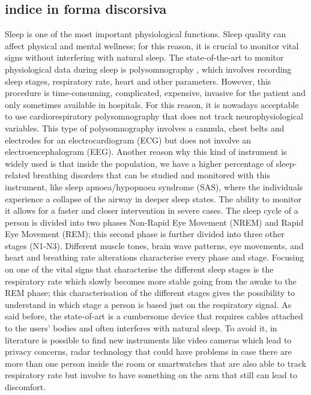 \subsection*{indice in forma discorsiva}
Sleep is one of the most important physiological functions. Sleep quality can affect physical 
and mental wellness; for this reason,
it is crucial to monitor vital signs without interfering with natural sleep. 
The state-of-the-art to monitor physiological data during sleep is polysomnography%
, which involves recording sleep stages, respiratory rate, heart and other parameters. However, this procedure is time-consuming, 
complicated, expensive, invasive for the patient and only sometimes available in hospitals. For this reason, it is nowadays 
acceptable to use cardiorespiratory polysomnography that does not track neurophysiological variables. This type of polysomnography
involves a cannula, chest belts and electrodes for an electrocardiogram (ECG) but does not involve an electroencephalogram (EEG).
Another reason why this kind of instrument is widely used is that inside the population, we have a higher percentage of 
sleep-related breathing disorders that can be studied and monitored with this instrument, like sleep apnoea/hypopnoea syndrome (SAS), 
where the individuals experience a collapse 
of the airway in deeper sleep states. The ability to monitor it allows for a faster and closer intervention in severe cases. 
The sleep cycle of a person is divided into two phases Non-Rapid Eye Movement (NREM) and Rapid Eye Movement (REM);
this second phase is further divided into three other stages (N1-N3). Different muscle tones, brain wave patterns, 
eye movements, and heart and breathing rate alterations characterise every phase and stage.
Focusing on one of the vital signs that characterise the different sleep stages is the respiratory rate 
which slowly becomes more stable going from the awake to the REM phase; this characterisation of the different stages gives the possibility to 
understand in which stage a person is based just on the respiratory signal.
As said before, the state-of-art is a cumbersome device that requires cables attached to the users' bodies and often interferes with natural sleep. To avoid it, in literature is possible to find new instruments like video cameras which lead to privacy concerns, radar technology that could have problems in case there are more than one person inside the room or smartwatches that are also able to track respiratory rate but involve to have something on the arm that still can lead to discomfort.

